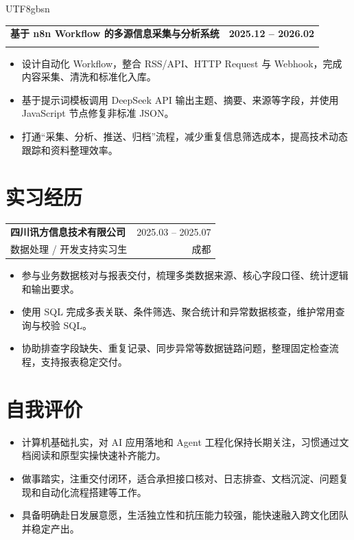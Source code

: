 \documentclass[10pt,a4paper]{article}
\makeatletter
\newcommand{\resumeSubheading}[4]{%
  \begin{tabularx}{\textwidth}{@{}X r@{}}
    \textbf{#1} & {\small #2} \\
    {\small\color{muted}#3} & {\small\color{muted}#4}
  \end{tabularx}
  \vspace{-1pt}
}
\newcommand{\projectHeading}[3]{%
  \vspace{1pt}
  \begin{tabularx}{\textwidth}{@{}>{\raggedright\arraybackslash}X r@{}}
    \textbf{#1} & {\small\bfseries #3} \\
    {\small\color{muted}#2} &
  \end{tabularx}
  \vspace{-3pt}
}
\makeatother
\begin{document}
\begin{CJK*}{UTF8}{gbsn}
\projectHeading
  {基于 n8n Workflow 的多源信息采集与分析系统}
  {n8n / DeepSeek API / Webhook / JavaScript}
  {2025.12 -- 2026.02}
\begin{itemize}
  \item 设计自动化 Workflow，整合 RSS/API、HTTP Request 与 Webhook，完成内容采集、清洗和标准化入库。
  \item 基于提示词模板调用 DeepSeek API 输出主题、摘要、来源等字段，并使用 JavaScript 节点修复非标准 JSON。
  \item 打通“采集、分析、推送、归档”流程，减少重复信息筛选成本，提高技术动态跟踪和资料整理效率。
\end{itemize}

\section{实习经历}
\resumeSubheading
  {四川讯方信息技术有限公司}
  {2025.03 -- 2025.07}
  {数据处理 / 开发支持实习生}
  {成都}
\begin{itemize}
  \item 参与业务数据核对与报表交付，梳理多类数据来源、核心字段口径、统计逻辑和输出要求。
  \item 使用 SQL 完成多表关联、条件筛选、聚合统计和异常数据核查，维护常用查询与校验 SQL。
  \item 协助排查字段缺失、重复记录、同步异常等数据链路问题，整理固定检查流程，支持报表稳定交付。
\end{itemize}

\section{自我评价}
\begin{itemize}
  \item 计算机基础扎实，对 AI 应用落地和 Agent 工程化保持长期关注，习惯通过文档阅读和原型实操快速补齐能力。
  \item 做事踏实，注重交付闭环，适合承担接口核对、日志排查、文档沉淀、问题复现和自动化流程搭建等工作。
  \item 具备明确赴日发展意愿，生活独立性和抗压能力较强，能快速融入跨文化团队并稳定产出。
\end{itemize}

\ifPDFTeX
\end{CJK*}
\fi
\end{document}
